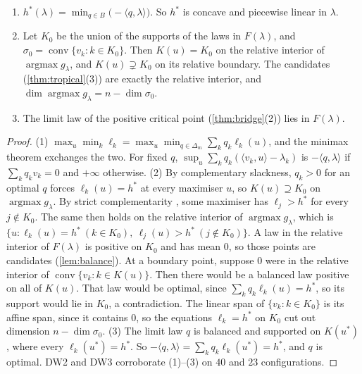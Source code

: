\documentclass[11pt]{article}
\theoremstyle{definition}\newtheorem{definition}[theorem]{Definition}\newtheorem{remark}[theorem]{Remark}\newtheorem{example}[theorem]{Example}\newtheorem{problem}[theorem]{Open problem}\crefname{problem}{Problem}{Problems}
\begin{document}
\begin{proposition}\label{prop:balancelp}
\begin{enumerate}
\item[(1)] $h^*(\lambda)=\min_{q\in B}\bigl(-\langle q,\lambda\rangle\bigr)$. So $h^*$ is concave and piecewise linear in $\lambda$.
\item[(2)] Let $K_0$ be the union of the supports of the laws in $F(\lambda)$, and $\sigma_0=\operatorname{conv}\{v_k:k\in K_0\}$. Then $K(u)=K_0$ on the relative interior of $\operatorname{argmax}g_\lambda$, and
  $K(u)\supsetneq K_0$ on its relative boundary. The candidates (\cref{thm:tropical}(3)) are exactly the relative interior, and $\dim\operatorname{argmax}g_\lambda=n-\dim\sigma_0$.
\item[(3)] The limit law of the positive critical point (\cref{thm:bridge}(2)) lies in $F(\lambda)$.
\end{enumerate}
\end{proposition}

\begin{proof}
(1) $\max_u\min_k\ell_k=\max_u\min_{q\in\Delta_m}\sum_kq_k\ell_k(u)$, and the minimax theorem exchanges the two. For fixed $q$, $\sup_u\sum_kq_k(\langle v_k,u\rangle-\lambda_k)$ is $-\langle q,\lambda\rangle$ if $\sum_kq_kv_k=0$
and $+\infty$ otherwise. (2) By complementary slackness, $q_k>0$ for an optimal $q$ forces $\ell_k(u)=h^*$ at every maximiser $u$, so $K(u)\supseteq K_0$ on $\operatorname{argmax}g_\lambda$. By strict
complementarity \cite{Schrijver1986}, some maximiser has $\ell_j>h^*$ for every $j\notin K_0$. The same then holds on the relative interior of $\operatorname{argmax}g_\lambda$, which is
$\{u:\ell_k(u)=h^*\ (k\in K_0),\ \ell_j(u)>h^*\ (j\notin K_0)\}$. A law in the relative interior of $F(\lambda)$ is positive on $K_0$ and has mean $0$, so those points are candidates (\cref{lem:balance}). At a
boundary point, suppose $0$ were in the relative interior of $\operatorname{conv}\{v_k:k\in K(u)\}$. Then there would be a balanced law positive on all of $K(u)$. That law would be optimal,
since $\sum_kq_k\ell_k(u)=h^*$, so its support would lie in $K_0$, a contradiction. The linear span of $\{v_k:k\in K_0\}$ is its affine span, since it contains $0$, so the equations $\ell_k=h^*$ on $K_0$ cut out
dimension $n-\dim\sigma_0$. (3) The limit law $q$ is balanced and supported on $K(u^*)$, where every $\ell_k(u^*)=h^*$. So $-\langle q,\lambda\rangle=\sum_kq_k\ell_k(u^*)=h^*$, and $q$ is optimal.
DW2 and DW3 corroborate (1)--(3) on $40$ and $23$ configurations.
\end{proof}
\end{document}
